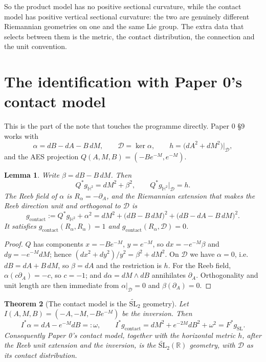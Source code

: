 \documentclass[11pt]{article}
\newtheorem{theorem}{Theorem}[section]
\newtheorem{lemma}[theorem]{Lemma}
\begin{document}
So the product model has no positive sectional curvature, while the contact
model has positive vertical sectional curvature: the two are genuinely different
Riemannian geometries on one and the same Lie group. The extra data that selects
between them is the metric, the contact distribution, the connection and the unit
convention.

\section{The identification with Paper 0's contact model}
\label{sec:paper0}

This is the part of the note that touches the programme directly. Paper 0 §9
works with
\[
\alpha=dB-dA-B\,dM,\qquad \mathcal D=\ker\alpha,\qquad
h=\bigl(dA^2+dM^2\bigr)\big|_{\mathcal D},
\]
and the AES projection $Q(A,M,B)=(-Be^{-M},e^{-M})$.

\begin{lemma}
\label{lem:paper0-data}
Write $\beta=dB-B\,dM$. Then
\[
Q^*g_{\mathbb H^2}=dM^2+\beta^2,
\qquad
Q^*g_{\mathbb H^2}\big|_{\mathcal D}=h .
\]
The Reeb field of $\alpha$ is $R_\alpha=-\partial_A$, and the Riemannian
extension that makes the Reeb direction unit and orthogonal to $\mathcal D$ is
\[
g_{\mathrm{contact}}:=Q^*g_{\mathbb H^2}+\alpha^2
=dM^2+\bigl(dB-B\,dM\bigr)^2+\bigl(dB-dA-B\,dM\bigr)^2 .
\]
It satisfies $g_{\mathrm{contact}}(R_\alpha,R_\alpha)=1$ and
$g_{\mathrm{contact}}(R_\alpha,\mathcal D)=0$.
\end{lemma}

\begin{proof}
$Q$ has components $x=-Be^{-M}$, $y=e^{-M}$, so $dx=-e^{-M}\beta$ and
$dy=-e^{-M}dM$; hence $(dx^2+dy^2)/y^2=\beta^2+dM^2$. On $\mathcal D$ we have
$\alpha=0$, i.e.\ $dB=dA+B\,dM$, so $\beta=dA$ and the restriction is $h$. For
the Reeb field, $\alpha(c\partial_A)=-c$, so $c=-1$; and
$d\alpha=dM\wedge dB$ annihilates $\partial_A$. Orthogonality and unit length are
then immediate from $\alpha|_{\mathcal D}=0$ and $\beta(\partial_A)=0$.
\end{proof}

\begin{theorem}[The contact model is the $\widetilde{\mathrm{SL}}_2$ geometry]
\label{thm:identification}
Let $I(A,M,B)=(-A,-M,-Be^{-M})$ be the inversion. Then
\[
I^*\alpha=dA-e^{-M}dB=:\omega,
\qquad
I^*g_{\mathrm{contact}}
=dM^2+e^{-2M}dB^2+\omega^2
=F^*g_{\mathrm{SL}} .
\]
Consequently Paper 0's contact model, together with the horizontal metric $h$,
after the Reeb unit extension and the inversion, \emph{is} the
$\widetilde{\mathrm{SL}}_2(\mathbb R)$ geometry, with $\mathcal D$ as its contact
distribution.
\end{theorem}
\end{document}
